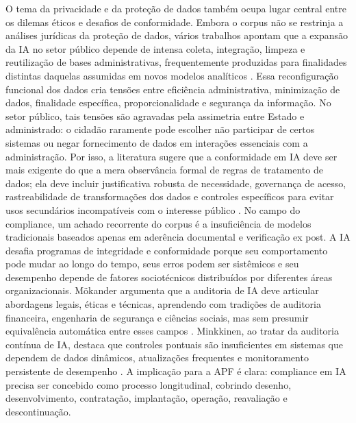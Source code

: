 \documentclass[12pt,a4paper]{article}
\begin{document}
O tema da privacidade e da proteção de dados também ocupa lugar central entre os dilemas éticos e desafios de conformidade. Embora o corpus não se restrinja a análises jurídicas da proteção de dados, vários trabalhos apontam que a expansão da IA no setor público depende de intensa coleta, integração, limpeza e reutilização de bases administrativas, frequentemente produzidas para finalidades distintas daquelas assumidas em novos modelos analíticos \autocite{parycek2023artificial} \autocite{serra2024a}. Essa reconfiguração funcional dos dados cria tensões entre eficiência administrativa, minimização de dados, finalidade específica, proporcionalidade e segurança da informação. No setor público, tais tensões são agravadas pela assimetria entre Estado e administrado: o cidadão raramente pode escolher não participar de certos sistemas ou negar fornecimento de dados em interações essenciais com a administração. Por isso, a literatura sugere que a conformidade em IA deve ser mais exigente do que a mera observância formal de regras de tratamento de dados; ela deve incluir justificativa robusta de necessidade, governança de acesso, rastreabilidade de transformações dos dados e controles específicos para evitar usos secundários incompatíveis com o interesse público \autocite{batool2025ai} \autocite{mkander2023auditing}.
No campo do compliance, um achado recorrente do corpus é a insuficiência de modelos tradicionais baseados apenas em aderência documental e verificação ex post. A IA desafia programas de integridade e conformidade porque seu comportamento pode mudar ao longo do tempo, seus erros podem ser sistêmicos e seu desempenho depende de fatores sociotécnicos distribuídos por diferentes áreas organizacionais. Mökander argumenta que a auditoria de IA deve articular abordagens legais, éticas e técnicas, aprendendo com tradições de auditoria financeira, engenharia de segurança e ciências sociais, mas sem presumir equivalência automática entre esses campos \autocite{mkander2023auditing}. Minkkinen, ao tratar da auditoria contínua de IA, destaca que controles pontuais são insuficientes em sistemas que dependem de dados dinâmicos, atualizações frequentes e monitoramento persistente de desempenho \autocite{minkkinen2022continuous}. A implicação para a APF é clara: compliance em IA precisa ser concebido como processo longitudinal, cobrindo desenho, desenvolvimento, contratação, implantação, operação, reavaliação e descontinuação.
\end{document}

